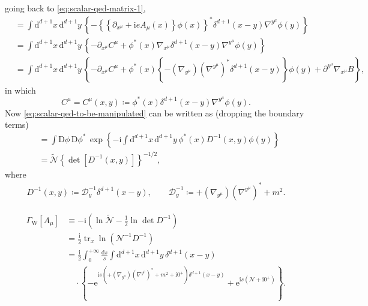\documentclass[12pt]{article}
\newcommand\mi{\mathrm{i}} %
\newcommand\me{\mathrm{e}} %
\newcommand\dif{\mathrm{d}}
\newcommand\Dif{\mathrm{D}}
\DeclareMathOperator{\tr}{tr}
\DeclareMathOperator{\Tr}{Tr}
\newcommand{\rbr}[1]{{\left(#1\right)}}
\newcommand{\cbr}[1]{{\left\{#1\right\}}}
\newcommand{\rfun}[2]{{#1}\mathopen{}\left(#2\right)\mathclose{}}
\newcommand{\sfun}[2]{{#1}\mathopen{}\left[#2\right]\mathclose{}}
\newcommand{\cfun}[2]{{#1}\mathopen{}\left\{#2\right\}\mathclose{}}
\begin{document}
going back to \cref{eq:scalar-qed-matrix-1},
\begin{align}
&= \int\dif^{d+1}x\,\dif^{d+1}y\,\cbr{
-\cbr{\cbr{\partial_{x^\mu}+\mi e \rfun{A_\mu}{x}}\rfun{\phi}{x}}^* 
\rfun{\delta^{d+1}}{x-y} \nabla^{y^\mu}\rfun{\phi}{y}}
\nonumber \\
&= \int\dif^{d+1}x\,\dif^{d+1}y\,\cbr{ -\partial_{x^\mu} C^\mu + 
\rfun{\phi^*}{x}
\nabla_{x^\mu}
\rfun{\delta^{d+1}}{x-y} \nabla^{y^\mu}\rfun{\phi}{y}} \nonumber \\
&= \int\dif^{d+1}x\,\dif^{d+1}y\,\cbr{ -\partial_{x^\mu} C^\mu + 
\rfun{\phi^*}{x}
\cbr{-\rbr{\nabla_{y^\mu}}\rbr{\nabla^{y^\mu}}^*\rfun{\delta^{d+1}}{x-y}}
\rfun{\phi}{y} + \partial^{y^\mu}\nabla_{x^\mu} B},
\end{align}
in which
\begin{equation}
C^\mu = \rfun{C^\mu}{x,y} \coloneqq \rfun{\phi^*}{x} 
\rfun{\delta^{d+1}}{x-y} \nabla^{y^\mu}\rfun{\phi}{y}.
\end{equation}
Now \cref{eq:scalar-qed-to-be-manipulated} can be written as (dropping the 
boundary terms)
\begin{align}
&= \int\Dif\phi\,\Dif\phi^*\,
\cfun{\exp}{-\mi\int\dif^{d+1} x\,\dif^{d+1} y\,
\rfun{\phi^*}{x} \rfun{D^{-1}}{x, y} \rfun{\phi}{y}}
\nonumber \\
&= \tilde{\mathcal{N}}\cbr{\sfun{\det}{\rfun{D^{-1}}{x, y}}}^{-1/2},
\end{align}
where
\begin{align}
\rfun{D^{-1}}{x, y} \coloneqq \mathcal{D}^{-1}_y \rfun{\delta^{d+1}}{x-y},\qquad
\mathcal{D}^{-1}_y \coloneqq +\rbr{\nabla_{y^\mu}}\rbr{\nabla^{y^\mu}}^* + m^2.
\end{align}

\begin{align}
\sfun{\varGamma_\text{W}}{A_\mu} &\equiv
-\mi\rbr{\ln\tilde{\mathcal{N}} - \frac{1}{2} \ln \det D^{-1}} \nonumber \\
&= \frac{\mi}{2} \tr_x \rfun{\ln}{\mathcal{N}^{-1} D^{-1}} \nonumber \\
&= \frac{\mi}{2} \int_0^{+\infty}\frac{\dif s}{s}
\int\dif^{d+1}x\,\dif^{d+1}y\,\rfun{\delta^{d+1}}{x-y} \nonumber \\
&\quad\cdot\cbr{
-\me^{\mi s\rbr{+\rbr{\nabla_{y^\mu}}\rbr{\nabla^{y^\mu}}^* + m^2 + \mi 0^+}
\rfun{\delta^{d+1}}{x-y}}
+\me^{\mi s\rbr{\mathcal{N}+\mi 0^+}}}.
\end{align}

\end{document}
